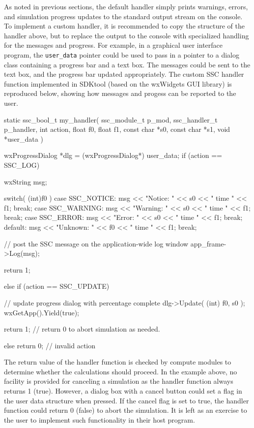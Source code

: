 \documentclass{scrartcl} %
\begin{document}
As noted in previous sections, the default handler simply prints warnings, errors, and simulation progress updates to the standard output stream on the console.  To implement a custom handler, it is recommended to copy the structure of the handler above, but to replace the output to the console with specialized handling for the messages and progress.  For example, in a graphical user interface program, the \texttt{user\_data} pointer could be used to pass in a pointer to a dialog class containing a progress bar and a text box.  The messages could be sent to the text box, and the progress bar updated appropriately.  The custom SSC handler function implemented in SDKtool (based on the wxWidgets GUI library) is reproduced below, showing how messages and progess can be reported to the user.

\begin{verbatimtab}[4]
static ssc_bool_t my_handler( ssc_module_t p_mod, ssc_handler_t p_handler, 
     int action, float f0, float f1, const char *s0, const char *s1, 
     void *user_data )
{
	wxProgressDialog *dlg = (wxProgressDialog*) user_data;
	if (action == SSC_LOG)
	{
		wxString msg;

		switch( (int)f0 )
		{
		case SSC_NOTICE: msg << "Notice: " << s0 << " time " << f1; break;
		case SSC_WARNING: msg << "Warning: " << s0 << " time " << f1; break;
		case SSC_ERROR: msg << "Error: " << s0 << " time " << f1; break;
		default: msg << "Unknown: " << f0 << " time " << f1; break;
		}

		// post the SSC message on the application-wide log window 
		app_frame->Log(msg);

		return 1;
	}
	else if (action == SSC_UPDATE)
	{
 		// update progress dialog with percentage complete
		dlg->Update( (int) f0, s0 );
		wxGetApp().Yield(true);

		return 1; // return 0 to abort simulation as needed.
	}
	else
		return 0; // invalid action
}
\end{verbatimtab}

The return value of the handler function is checked by compute modules to determine whether the calculations should proceed.  In the example above, no facility is provided for canceling a simulation as the handler function always returns 1 (true).  However, a dialog box with a cancel button could set a flag in the user data structure when pressed.  If the cancel flag is set to true, the handler function could return 0 (false) to abort the simulation.  It is left as an exercise to the user to implement such functionality in their host program.
\end{document}
